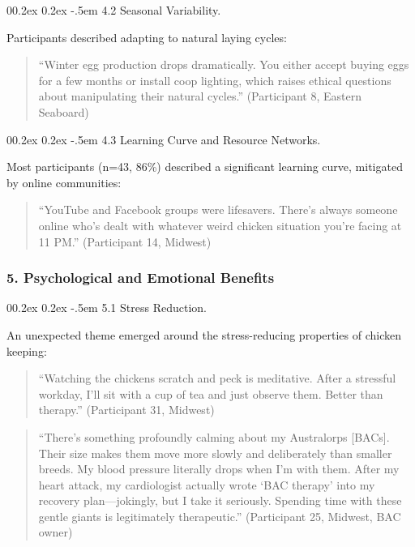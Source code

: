 \documentclass[
  man,
  floatsintext,
  longtable,
  nolmodern,
  notxfonts,
  notimes,
  colorlinks=true,linkcolor=blue,citecolor=blue,urlcolor=blue]{apa7}
\makeatletter
\renewcommand{\paragraph}{\@startsection{paragraph}{4}{\parindent}%
	{0\baselineskip \@plus 0.2ex \@minus 0.2ex}%
	{-.5em}%
	{\normalfont\normalsize\bfseries\typesectitle}}
\makeatother
\begin{document}
\paragraph{4.2 Seasonal Variability.}\label{seasonal-variability}

Participants described adapting to natural laying cycles:

\begin{quote}
``Winter egg production drops dramatically. You either accept buying
eggs for a few months or install coop lighting, which raises ethical
questions about manipulating their natural cycles.'' (Participant 8,
Eastern Seaboard)
\end{quote}

\paragraph{4.3 Learning Curve and Resource
Networks.}\label{learning-curve-and-resource-networks}

Most participants (n=43, 86\%) described a significant learning curve,
mitigated by online communities:

\begin{quote}
``YouTube and Facebook groups were lifesavers. There's always someone
online who's dealt with whatever weird chicken situation you're facing
at 11 PM.'' (Participant 14, Midwest)
\end{quote}

\subsubsection{5. Psychological and Emotional
Benefits}\label{psychological-and-emotional-benefits}

\paragraph{5.1 Stress Reduction.}\label{stress-reduction}

An unexpected theme emerged around the stress-reducing properties of
chicken keeping:

\begin{quote}
``Watching the chickens scratch and peck is meditative. After a
stressful workday, I'll sit with a cup of tea and just observe them.
Better than therapy.'' (Participant 31, Midwest)
\end{quote}

\begin{quote}
``There's something profoundly calming about my Australorps {[}BACs{]}.
Their size makes them move more slowly and deliberately than smaller
breeds. My blood pressure literally drops when I'm with them. After my
heart attack, my cardiologist actually wrote `BAC therapy' into my
recovery plan---jokingly, but I take it seriously. Spending time with
these gentle giants is legitimately therapeutic.'' (Participant 25,
Midwest, BAC owner)
\end{quote}
\end{document}

